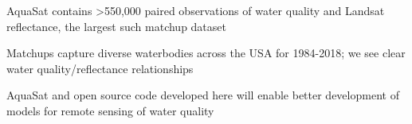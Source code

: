 \documentclass[]{agujournal2018}
\begin{document}





\begin{keypoints}
\item AquaSat contains \textgreater{}550,000 paired observations of water
quality and Landsat reflectance, the largest such matchup dataset
\item Matchups capture diverse waterbodies across the USA for 1984-2018; we
see clear water quality/reflectance relationships
\item AquaSat and open source code developed here will enable better
development of models for remote sensing of water quality
\end{keypoints}

%
%

\end{document}
